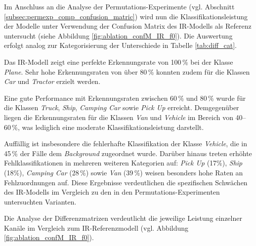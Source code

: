 Im Anschluss an die Analyse der Permutations-Experimente (vgl. Abschnitt \ref{subsec:permexp_comp_confusion_matric}) wird nun die Klassifikationsleistung der Modelle unter Verwendung der Confusion Matrix des IR-Modells als Referenz untersucht (siehe Abbildung \ref{fig:ablation_confM_IR_f0}). Die Auswertung erfolgt analog zur Kategorisierung der Unterschiede in Tabelle \ref{tab:diff_cat}.  

Das IR-Modell zeigt eine perfekte Erkennungsrate von 100\,\% bei der Klasse \textit{Plane}. Sehr hohe Erkennungsraten von über 80\,\% konnten zudem für die Klassen \textit{Car} und \textit{Tractor} erzielt werden.

Eine gute Performance mit Erkennungsraten zwischen 60\,\% und 80\,\% wurde für die Klassen \textit{Truck}, \textit{Ship}, \textit{Camping Car} sowie \textit{Pick Up} erreicht. Demgegenüber liegen die Erkennungsraten für die Klassen \textit{Van} und \textit{Vehicle} im Bereich von 40--60\,\%, was lediglich eine moderate Klassifikationsleistung darstellt.  

Auffällig ist insbesondere die fehlerhafte Klassifikation der Klasse \textit{Vehicle}, die in 45\,\% der Fälle dem \textit{Background} zugeordnet wurde. Darüber hinaus treten erhöhte Fehlklassifikationen in mehreren weiteren Kategorien auf: \textit{Pick Up} (17\%), \textit{Ship} (18\%), \textit{Camping Car} (28\,\%) sowie \textit{Van} (39\,\%) weisen besonders hohe Raten an Fehlzuordnungen auf. Diese Ergebnisse verdeutlichen die spezifischen Schwächen des IR-Modells im Vergleich zu den in den Permutations-Experimenten untersuchten Varianten.  


Die Analyse der Differenzmatrizen verdeutlicht die jeweilige Leistung einzelner Kanäle im Vergleich zum IR-Referenzmodell (vgl. Abbildung \ref{fig:ablation_confM_IR_f0}).  

